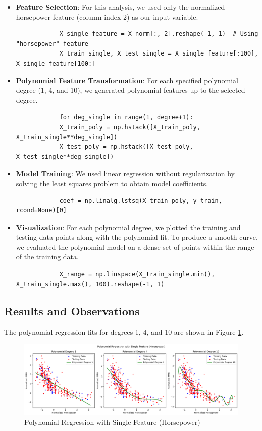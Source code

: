 \documentclass{article}
\begin{document}
	\begin{itemize}
		\item \textbf{Feature Selection}: For this analysis, we used only the normalized horsepower feature (column index 2) as our input variable.
		\begin{verbatim}
			X_single_feature = X_norm[:, 2].reshape(-1, 1)  # Using "horsepower" feature
			X_train_single, X_test_single = X_single_feature[:100], X_single_feature[100:]
		\end{verbatim}
		
		\item \textbf{Polynomial Feature Transformation}: For each specified polynomial degree (1, 4, and 10), we generated polynomial features up to the selected degree.
		\begin{verbatim}
			for deg_single in range(1, degree+1):
			X_train_poly = np.hstack([X_train_poly, X_train_single**deg_single])
			X_test_poly = np.hstack([X_test_poly, X_test_single**deg_single])
		\end{verbatim}
		
		\item \textbf{Model Training}: We used linear regression without regularization by solving the least squares problem to obtain model coefficients.
		\begin{verbatim}
			coef = np.linalg.lstsq(X_train_poly, y_train, rcond=None)[0]
		\end{verbatim}
		
		\item \textbf{Visualization}: For each polynomial degree, we plotted the training and testing data points along with the polynomial fit. To produce a smooth curve, we evaluated the polynomial model on a dense set of points within the range of the training data.
		\begin{verbatim}
			X_range = np.linspace(X_train_single.min(), X_train_single.max(), 100).reshape(-1, 1)
		\end{verbatim}
	\end{itemize}
	
	\subsection*{Results and Observations}
	
	The polynomial regression fits for degrees 1, 4, and 10 are shown in Figure \ref{fig:single_feature_polynomial_fits}. 
	
	\begin{figure}[h!]
		\centering
		\includegraphics[width=\textwidth]{images/q4_part2.png} %
		\caption{Polynomial Regression with Single Feature (Horsepower)}
		\label{fig:single_feature_polynomial_fits}
	\end{figure}
	
\end{document}
